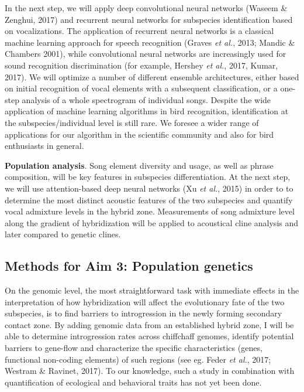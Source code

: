 \documentclass[11pt,a4paper]{article}
\begin{document}
In the next step, we will apply deep convolutional neural networks (Waseem \& Zenghui, 2017) and recurrent neural networks for subspecies identification based on vocalizations. The application of recurrent neural networks is a classical machine learning approach for speech recognition (Graves \textit{et al.}, 2013; Mandic \& Chambers 2001), while convolutional neural networks are increasingly used for sound recognition discrimination (for example, Hershey \textit{et al.}, 2017, Kumar, 2017). We will optimize a number of different ensemble architectures, either based on initial recognition of vocal elements with a subsequent classification, or a one-step analysis of a whole spectrogram of individual songs. 
Despite the wide application of machine learning algorithms in bird recognition, identification at the subspecies/individual level is still rare. We foresee a wider range of applications for our algorithm in the scientific community and also for bird enthusiasts in general. 

\textbf{Population analysis}. 
Song element diversity and usage, as well as phrase composition, will be key features in subspecies differentiation. At the next step, we will use attention-based deep neural networks (Xu \textit{et al.}, 2015) in order to to determine the most distinct acoustic features of the two subspecies and quantify vocal admixture levels in the hybrid zone. Measurements of song admixture level along the gradient of hybridization will be applied to acoustical cline analysis and later compared to genetic clines. 


\subsection{Methods for Aim 3: Population genetics}

On the genomic level, the most straightforward task with immediate effects in the interpretation of how hybridization will affect the evolutionary fate of the two subspecies, is to find barriers to introgression in the newly forming secondary contact zone. By adding genomic data from an established hybrid zone, I will be able to determine introgression rates across chiffchaff genomes, identify potential barriers to gene-flow and characterize the specific characteristics (genes, functional non-coding elements) of such regions (see eg. Feder \textit{et al.}, 2017; Westram \& Ravinet, 2017). To our knowledge, such a study in combination with quantification of ecological and behavioral traits has not yet been done. 
\end{document}
